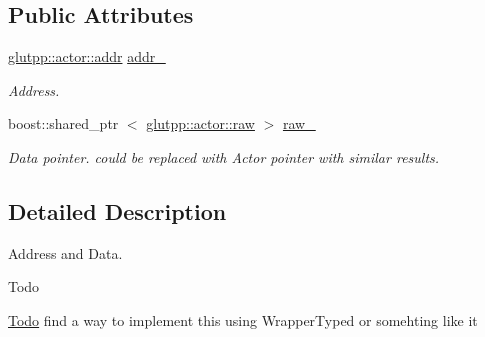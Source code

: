 \subsection*{\-Public \-Attributes}
\begin{DoxyCompactItemize}
\item 
\hypertarget{structglutpp_1_1network_1_1actor_1_1update_1_1addr__raw_a30478c5051b040fbaafb8fb138793517}{\hyperlink{classglutpp_1_1actor_1_1addr}{glutpp\-::actor\-::addr} \hyperlink{structglutpp_1_1network_1_1actor_1_1update_1_1addr__raw_a30478c5051b040fbaafb8fb138793517}{addr\-\_\-}}\label{structglutpp_1_1network_1_1actor_1_1update_1_1addr__raw_a30478c5051b040fbaafb8fb138793517}

\begin{DoxyCompactList}\small\item\em \-Address. \end{DoxyCompactList}\item 
\hypertarget{structglutpp_1_1network_1_1actor_1_1update_1_1addr__raw_a78a532b30c2fe195ce15e420c25d45d7}{boost\-::shared\-\_\-ptr\*
$<$ \hyperlink{classglutpp_1_1actor_1_1raw}{glutpp\-::actor\-::raw} $>$ \hyperlink{structglutpp_1_1network_1_1actor_1_1update_1_1addr__raw_a78a532b30c2fe195ce15e420c25d45d7}{raw\-\_\-}}\label{structglutpp_1_1network_1_1actor_1_1update_1_1addr__raw_a78a532b30c2fe195ce15e420c25d45d7}

\begin{DoxyCompactList}\small\item\em \-Data pointer. could be replaced with \-Actor pointer with similar results. \end{DoxyCompactList}\end{DoxyCompactItemize}


\subsection{\-Detailed \-Description}
\-Address and \-Data. 

\begin{DoxyRefDesc}{\-Todo}
\item[\hyperlink{todo__todo000005}{\-Todo}]find a way to implement this using \-Wrapper\-Typed or somehting like it \end{DoxyRefDesc}


